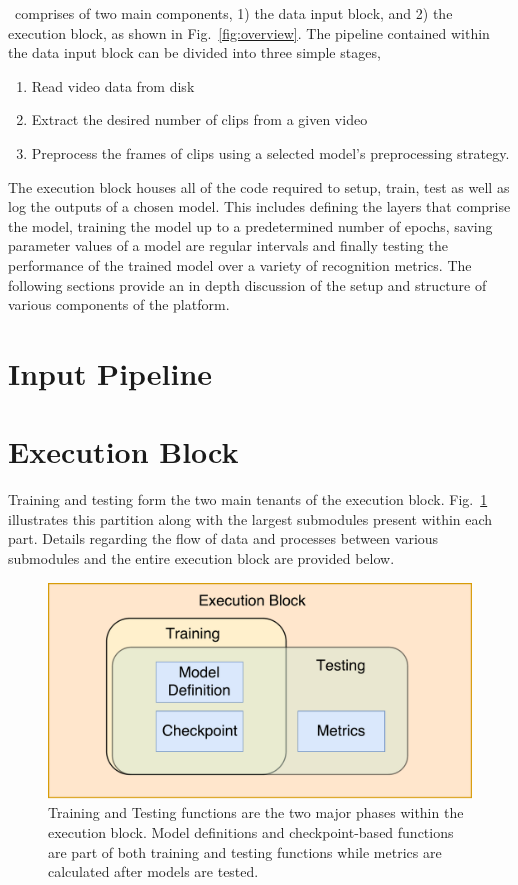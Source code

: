 \documentclass{llncs}
\begin{document}
\acro~comprises of two main components, 1) the data input block, and 2) the execution block, as shown in Fig.~\ref{fig:overview}. 
The pipeline contained within the data input block can be divided into three simple stages,
\begin{enumerate}
\item Read video data from disk
\item Extract the desired number of clips from a given video
\item Preprocess the frames of clips using a selected model's preprocessing strategy.
\end{enumerate}
The execution block houses all of the code required to setup, train, test as well as log the outputs of a chosen model.
This includes defining the layers that comprise the model, training the model up to a predetermined number of epochs, saving parameter values of a model are regular intervals and finally testing the performance of the trained model over a variety of recognition metrics.
The following sections provide an in depth discussion of the setup and structure of various components of the platform.

\section{Input Pipeline}
\label{sec:ippipeline}

\section{Execution Block}
\label{sec:execblock}
Training and testing form the two main tenants of the execution block. 
Fig.~\ref{fig:exec_block} illustrates this partition along with the largest submodules present within each part.
Details regarding the flow of data and processes between various submodules and the entire execution block are provided below.

\begin{figure}[t!]
\centering
\includegraphics[width=0.8\columnwidth]{images/exec_block.pdf}
\caption{Training and Testing functions are the two major phases within the execution block. Model definitions and checkpoint-based functions are part of both training and testing functions while metrics are calculated after models are tested.}
\label{fig:exec_block}
\end{figure}
\end{document}

